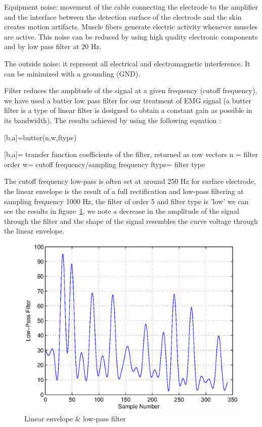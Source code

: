 \documentclass[conference]{IEEEtran}
\begin{document}
Equipment noise: movement of the cable connecting the electrode to the amplifier and the interface between the detection surface of the electrode and the skin creates motion artifacts. Muscle fibers generate electric activity whenever muscles are active. This noise can be reduced by using high quality electronic components and by low pass filter at 20 Hz.\par

The outside noise: it represent all electrical and electromagnetic interference. It can be minimized with a grounding (GND).\par

Filter reduces the amplitude of the signal at a given frequency (cutoff frequency), we have used a butter low pass filter for our treatment of EMG signal (a butter filter is a type of linear filter is designed to obtain a constant gain as possible in its bandwidth). The results achieved by using the following equation :

      [b,a]=butter(n,w,ftype)

      [b,a]= transfer function coefficients of the filter, returned as row vectors
      n = filter order
      w= cutoff frequency/sampling frequency
      ftype= filter type \par


The cutoff frequency low-pass is often set at around 250 Hz for surface electrode, the linear envelope is the result of a full rectification and low-pass filtering at sampling frequency 1000 Hz, the filter of order 5 and filter type is 'low' we can see the results in figure~\ref{fig:env}, 
we note a decrease in the amplitude of the signal through the filter and the shape of the signal resembles the curve voltage through the linear envelope.\par

\begin{figure}
    \hspace*{1.2 cm}
    \includegraphics[scale=0.40]{Figures/filter1.eps}
    \caption{Linear envelope & low-pass filter}
    \label{fig:env}
\end{figure}
\end{document}
